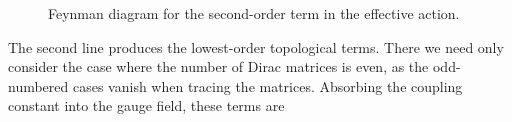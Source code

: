 \begin{figure}[!ht]
	\centering
	\caption{Feynman diagram for the second-order term in the effective action.}
	\label{fig:second_order_fd}
\end{figure}

The second line produces the lowest-order topological terms. There we need only consider the case where the number of Dirac matrices is even, as the odd-numbered cases vanish when tracing the matrices. Absorbing the coupling constant into the gauge field, these terms are
